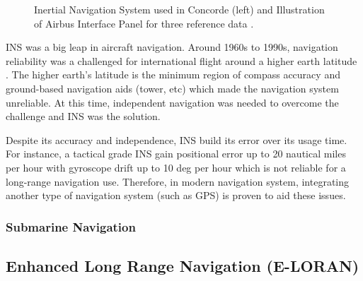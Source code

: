 \begin{figure}[!ht]
\begin{center}
\begin{subfigure}[b]{0.45\textwidth}
  \end{subfigure}
% 
    \begin{center}
  \caption{Inertial Navigation System used in Concorde (left) \cite{InertialAviation} and Illustration of Airbus Interface Panel for three reference data \cite{AircraftSystems}. }
    \label{fig:2}
    \end{center}
\end{center}
\end{figure}


\noindent INS was a big leap in aircraft navigation. Around 1960s to 1990s, navigation reliability was a challenged for international flight around a higher earth latitude \cite{1964InertialNavigation}. The higher earth's latitude is the minimum region of compass accuracy and ground-based navigation aids (tower, etc) which made the navigation system unreliable. At this time, independent navigation was needed to overcome the challenge and INS was the solution.

\noindent Despite its accuracy and independence, INS build its error over its usage time. For instance, a tactical grade INS gain positional error up to 20 nautical miles per hour with gyroscope drift up to 10 deg per hour which is not reliable for a long-range navigation use. Therefore, in modern navigation system, integrating another type of navigation system (such as GPS) is proven to aid these issues.

\subsubsection{Submarine Navigation}







\subsection{Enhanced Long Range Navigation (E-LORAN)}